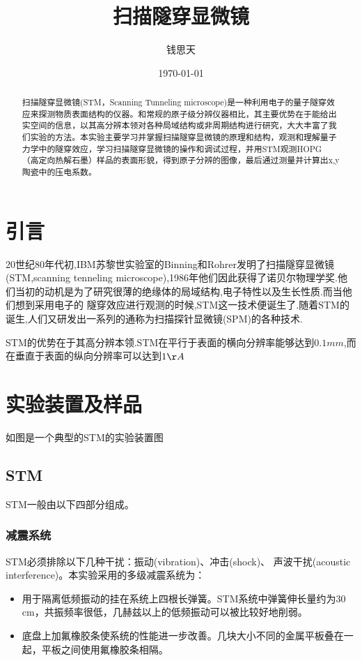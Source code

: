 \documentclass[aps,pre,12pt,preprint,onecolumn,showpacs,showkeys]{revtex4-1}
\begin{document}
\title{\bf\heiti{}扫描隧穿显微镜\vspace{15mm}}
\author{\fangsong{}钱思天\vspace{2mm}}
\date{\today}

\begin{abstract}
\vspace{10mm}
\begin{spacing}{1.5}
\songti{}
扫描隧穿显微镜(STM，Scanning Tunneling microscope)是一种利用电子的量子隧穿效应来探测物质表面结构的仪器。和常规的原子级分辨仪器相比，其主要优势在于能给出实空间的信息，以其高分辨本领对各种局域结构或非周期结构进行研究，大大丰富了我们实验的方法。本实验主要学习并掌握扫描隧穿显微镜的原理和结构，观测和理解量子力学中的隧穿效应，学习扫描隧穿显微镜的操作和调试过程，并用STM观测HOPG （高定向热解石墨）样品的表面形貌，得到原子分辨的图像，最后通过测量并计算出x,y陶瓷中的压电系数。
\end{spacing}
\end{abstract}
\maketitle
\songti{}


\section{引言}
20世纪80年代初,IBM苏黎世实验室的Binning和Rohrer发明了扫描隧穿显微镜(STM,scanning tenneling microscope),1986年他们因此获得了诺贝尔物理学奖.他们当初的动机是为了研究很薄的绝缘体的局域结构,电子特性以及生长性质.而当他们想到采用电子的
隧穿效应进行观测的时候,STM这一技术便诞生了.随着STM的诞生,人们又研发出一系列的通称为扫描探针显微镜(SPM)的各种技术.\par
STM的优势在于其高分辨本领.STM在平行于表面的横向分辨率能够达到$0.1\si{mm}$,而在垂直于表面的纵向分辨率可以达到$1\AA$
\section{实验装置及样品}
如图是一个典型的STM的实验装置图
\subsection{STM}
STM一般由以下四部分组成。
\subsubsection{减震系统}
STM必须排除以下几种干扰：振动(vibration)、冲击(shock)、 声波干扰(acoustic interference)。本实验采用的多级减震系统为：
\begin{itemize}
\item 用于隔离低频振动的挂在系统上四根长弹簧。STM系统中弹簧伸长量约为30 cm，共振频率很低，几赫兹以上的低频振动可以被比较好地削弱。
\item 底盘上加氟橡胶条使系统的性能进一步改善。几块大小不同的金属平板叠在一起，平板之间使用氟橡胶条相隔。
\end{itemize}
\end{document}
